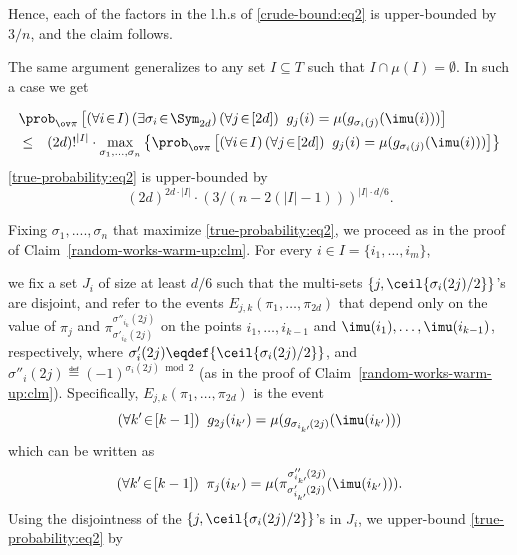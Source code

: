 Hence, each of the factors in the l.h.s of \eqref{crude-bound:eq2}
is upper-bounded by $3/n$, and the claim follows.
\Epf


%
The same argument generalizes to any set $I\subseteq T$
such that $I\cap\mu(I)=\emptyset$.
In such a case we get





















\begin{eqnarray}
\lefteqn{\prob_{\ov\pi}\left[(\forall i\!\in\!I)\,
                    (\exists\sigma_i\!\in\!\Sym_{2d})\,
                    (\forall j\!\in\![2d])\;\;
                  g_j(i)=\mu(g_{\sigma_i(j)}(\imu(i)))\right]}
\nonumber \\
&\leq& (2d)!^{|I|}\cdot\max_{\sigma_1,\ldots,\sigma_n}
  \left\{\prob_{\ov\pi}\left[(\forall i\!\in\!I)\,(\forall j\!\in\![2d])
            \;\;g_j(i)=\mu(g_{\sigma_i(j)}(\imu(i)))\right] \right\}
\label{true-probability:eq2}
\end{eqnarray}
\label{random-works-actual:clm}
\eqref{true-probability:eq2} is upper-bounded by
%
\begin{equation} \label{true-probability:eq3}
(2d)^{2d\cdot|I|}\cdot(3/(n-2(|I|-1)))^{|I|\cdot d/6}.
\end{equation}
\Ecm

\Bpf
Fixing $\sigma_1,....,\sigma_n$
that maximize \eqref{true-probability:eq2},
we proceed as in the proof of Claim~\ref{random-works-warm-up:clm}.
For every $i\in I=\{i_1,\ldots,i_m\}$,

we fix a set $J_i$ of size at least $d/6$ such that
the multi-sets $\{j,\ceil{\sigma_i(2j)/2}\}$'s are disjoint,
and refer to the events $E_{j,k}(\pi_1,\ldots,\pi_{2d})$
that depend only on the value of $\pi_j$
and $\pi^{\sigma''_{i_k}\!(2j)}_{\sigma'_{i_k}\!(2j)}$
on the points $i_1,\ldots,i_{k-1}$ and $\imu(i_1),\ldots,\imu(i_{k-1})$,
respectively, where $\sigma'_{i}(2j)\eqdef{\ceil{\sigma_{i}(2j)/2}}$,
and $\sigma''_{i}(2j)\eqdef(-1)^{\sigma_{i}(2j)\bmod2}$
(as in the proof of Claim~\ref{random-works-warm-up:clm}).
Specifically, $E_{j,k}(\pi_1,\ldots,\pi_{2d})$ is the event
$$(\forall k'\!\in\![k-1])
             \;\;g_{2j}(i_{k'})=\mu(g_{\sigma_{i_{k'}}\!(2j)}(\imu(i_{k'})))$$
which can be written as
$$(\forall k'\!\in\![k-1]) \;\; \pi_j(i_{k'})
  =\mu(\pi^{\sigma''_{i_{k'}}\!(2j)}_{\sigma'_{i_{k'}}\!(2j)}(\imu(i_{k'}))).$$
Using the disjointness of the $\{j,\ceil{\sigma_i(2j)/2}\}$'s in $J_i$,
we upper-bound \eqref{true-probability:eq2} by

